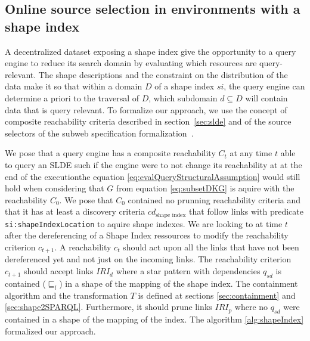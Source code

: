 \subsection{Online source selection in environments with a shape index}

A decentralized dataset exposing a shape index give the opportunity to a query engine to reduce its search domain by evaluating which resources are query-relevant.
The shape descriptions and the constraint on the distribution of the data make it so that within a domain $D$ of a shape index $si$, the query engine can
determine a priori to the traversal of $D$, which subdomain $d \subseteq D$ will contain data that is query relevant.
To formalize our approach, we use the concept of composite reachability criteria described in section~\ref{sec:slde} and of the source selectors of the subweb specification formalization~\cite{Bogaerts2021LinkTW, Taelman2023}.

We pose that a query engine has a composite reachability $C_t$ at any time $t$ able to query an SLDE such if the engine were to not change its reachability
at at the end of the executionthe equation \ref{eq:evalQueryStructuralAssumption} would still hold when considering that $G$ from equation \ref{eq:subsetDKG} is aquire with the reachability $C_0$.
We pose that $C_0$ contained no prunning reachability criteria and that it has at least a discovery criteria $cd_{\text{shape index}}$ 
that follow links with predicate \texttt{si:shapeIndexLocation} to aquire shape indexes.
We are looking to at time $t$ after the dereferencing of a Shape Index ressources to modify the reachability criterion $c_{t+1}$.
A reachability $c_t$ should act upon all the links that have not been dereferenced yet and not just on the incoming links.
The reachability criterion $c_{t+1}$ should accept links $IRI_d$ where a star pattern with dependencies $q_{sd}$ is contained ($\sqsubseteq_l$) in a shape of the mapping of the shape index.
The containment algorithm and the transformation $T$ is defined at sections \ref{sec:containment} and \ref{sec:shape2SPARQL}.
Furthermore, it should prune links $IRI_p$ where no $q_{sd}$ were contained in a shape of the mapping of the index.
The algorithm \ref{alg:shapeIndex} formalized our approach.

